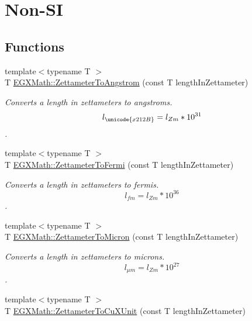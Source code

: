 \hypertarget{group___e_g_x_math-_conversions-_length_conversions-_s_i-_zettameter-_non-_s_i}{}\section{Non-\/\+SI}
\label{group___e_g_x_math-_conversions-_length_conversions-_s_i-_zettameter-_non-_s_i}
\subsection*{Functions}
\begin{DoxyCompactItemize}
\item 
{\footnotesize template$<$typename T $>$ }\\T \mbox{\hyperlink{group___e_g_x_math-_conversions-_length_conversions-_s_i-_zettameter-_non-_s_i_ga49d813ff9592fc1fc9a184436d0849fc}{E\+G\+X\+Math\+::\+Zettameter\+To\+Angstrom}} (const T length\+In\+Zettameter)
\begin{DoxyCompactList}\small\item\em Converts a length in zettameters to angstroms. \[ l_{\unicode{x212B}}=l_{Zm} * 10^{31} \]. \end{DoxyCompactList}\item 
{\footnotesize template$<$typename T $>$ }\\T \mbox{\hyperlink{group___e_g_x_math-_conversions-_length_conversions-_s_i-_zettameter-_non-_s_i_ga791b0a401fe813fe4e6a34490f12a817}{E\+G\+X\+Math\+::\+Zettameter\+To\+Fermi}} (const T length\+In\+Zettameter)
\begin{DoxyCompactList}\small\item\em Converts a length in zettameters to fermis. \[ l_{fm}=l_{Zm} * 10^{36} \]. \end{DoxyCompactList}\item 
{\footnotesize template$<$typename T $>$ }\\T \mbox{\hyperlink{group___e_g_x_math-_conversions-_length_conversions-_s_i-_zettameter-_non-_s_i_gafede369c63111d97f92238e626cdfa87}{E\+G\+X\+Math\+::\+Zettameter\+To\+Micron}} (const T length\+In\+Zettameter)
\begin{DoxyCompactList}\small\item\em Converts a length in zettameters to microns. \[ l_{\mu m}=l_{Zm} * 10^{27} \]. \end{DoxyCompactList}\item 
{\footnotesize template$<$typename T $>$ }\\T \mbox{\hyperlink{group___e_g_x_math-_conversions-_length_conversions-_s_i-_zettameter-_non-_s_i_ga91f2890d91086a45ad9d2b5e7e82b60a}{E\+G\+X\+Math\+::\+Zettameter\+To\+Cu\+X\+Unit}} (const T length\+In\+Zettameter)

\end{DoxyCompactItemize}
